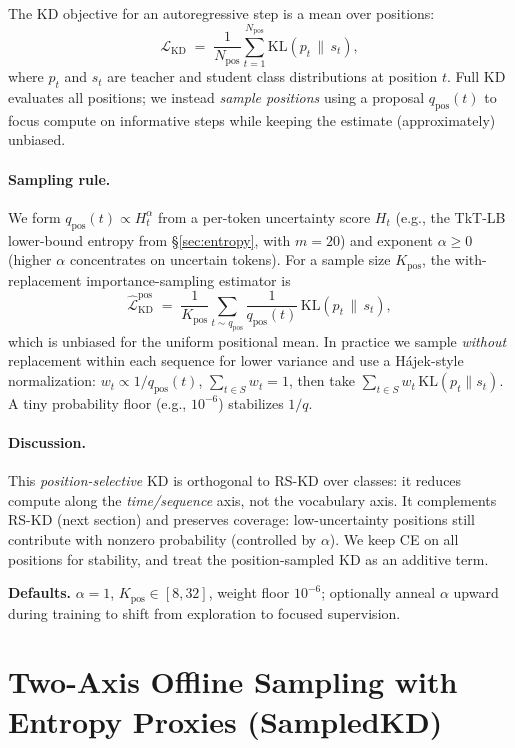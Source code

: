 \documentclass[11pt]{article}
\begin{document}
The KD objective for an autoregressive step is a mean over positions:
\[
\mathcal{L}_{\text{KD}} \;=\; \frac{1}{N_{\text{pos}}} \sum_{t=1}^{N_{\text{pos}}} 
\mathrm{KL}\!\left(p_t \,\|\, s_t\right),
\]
where $p_t$ and $s_t$ are teacher and student class distributions at position $t$.
Full KD evaluates all positions; we instead \emph{sample positions} using a proposal
$q_{\text{pos}}(t)$ to focus compute on informative steps while keeping the estimate (approximately) unbiased.

\paragraph{Sampling rule.}
We form $q_{\text{pos}}(t) \propto H_t^\alpha$ from a per-token uncertainty score $H_t$
(e.g., the TkT-LB lower-bound entropy from \S\ref{sec:entropy}, with $m{=}20$) and exponent $\alpha\!\ge\!0$ (higher $\alpha$ concentrates on uncertain tokens). For a sample size $K_{\text{pos}}$, the with-replacement importance-sampling estimator is
\[
\widehat{\mathcal{L}}_{\text{KD}}^{\text{pos}} \;=\;
\frac{1}{K_{\text{pos}}} \sum_{t \sim q_{\text{pos}}}
\frac{1}{q_{\text{pos}}(t)} \,\mathrm{KL}\!\left(p_t \,\|\, s_t\right),
\]
which is unbiased for the uniform positional mean. In practice we sample \emph{without} replacement within each sequence for lower variance and use a Hájek-style normalization: $w_t \propto 1/q_{\text{pos}}(t)$, $\sum_{t\in S} w_t=1$, then take $\sum_{t\in S} w_t\,\mathrm{KL}(p_t\|s_t)$.
A tiny probability floor (e.g., $10^{-6}$) stabilizes $1/q$.

\paragraph{Discussion.}
This \emph{position-selective} KD is orthogonal to RS-KD over classes: it reduces compute along the \emph{time/sequence} axis, not the vocabulary axis. It complements RS-KD (next section) and preserves coverage: low-uncertainty positions still contribute with nonzero probability (controlled by $\alpha$).
We keep CE on all positions for stability, and treat the position-sampled KD as an additive term.

\vspace{0.5em}
\noindent\textbf{Defaults.}
$\alpha{=}1$, $K_{\text{pos}}\!\in\![8,32]$, weight floor $10^{-6}$; optionally anneal $\alpha$ upward during training to shift from exploration to focused supervision.


\section{Two-Axis Offline Sampling with Entropy Proxies (SampledKD)}
\label{sec:twoaxis}
\end{document}
